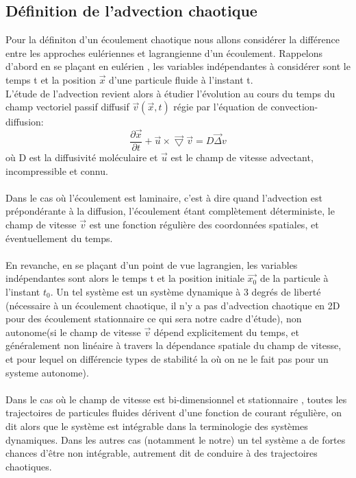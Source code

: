 \documentclass[a4paper,12pt,titlepage]{report}
\begin{document}
\begin{onehalfspace}
\subsection{Définition de l'advection chaotique}
Pour la définiton d'un écoulement chaotique nous allons considérer la différence entre les approches eulériennes et lagrangienne d'un écoulement. 
 Rappelons  d'abord en se plaçant en eulérien , les variables indépendantes à considérer sont le temps t et la position $\vec{x}$ d'une particule fluide à l'instant t. \\
 L'étude de l'advection revient alors à étudier l'évolution au cours du temps du champ vectoriel passif diffusif $\vec{v}(\vec{x},t)$ régie par l'équation de convection-diffusion: 
 \[
 \frac{\partial \vec{x}}{\partial t} + \vec{u} \times \vec{\bigtriangledown}\vec{v}= D \vec{\Delta} v
\]
où D est la diffusivité moléculaire et $\vec{u}$ est le champ de vitesse advectant, incompressible et connu. \\
\\
Dans le cas où l'écoulement est laminaire, c'est à dire quand l'advection est prépondérante à la diffusion, l'écoulement étant complètement déterministe, le champ de vitesse $\vec{v}$ est une fonction régulière des coordonnées spatiales, et éventuellement du temps. 
\\ 
\\
En revanche, en se plaçant d'un point de vue lagrangien, les variables indépendantes sont alors le temps t et la position initiale $\vec{x_0}$ de la particule à l'instant $t_0$. Un tel système est un système dynamique à 3 degrés de liberté (nécessaire à un écoulement chaotique, il n'y a pas d'advection chaotique en 2D pour des écoulement stationnaire ce qui sera notre cadre d'étude), non autonome(si le champ de vitesse $\vec{v}$ dépend explicitement du temps, et généralement non linéaire à travers la dépendance spatiale du champ de vitesse, et pour lequel on différencie types de stabilité la où on ne le fait pas pour un systeme autonome). \\
\\
Dans le cas où le champ de vitesse est bi-dimensionnel et stationnaire , toutes les trajectoires de particules  fluides dérivent d'une fonction de courant régulière, on dit alors que le système est intégrable dans la terminologie des systèmes dynamiques. 
Dans les autres cas (notamment le notre) un tel système a de fortes chances d'être non intégrable, autrement dit de conduire à des trajectoires chaotiques. 
\\
\\

\end{onehalfspace}
\end{document}
